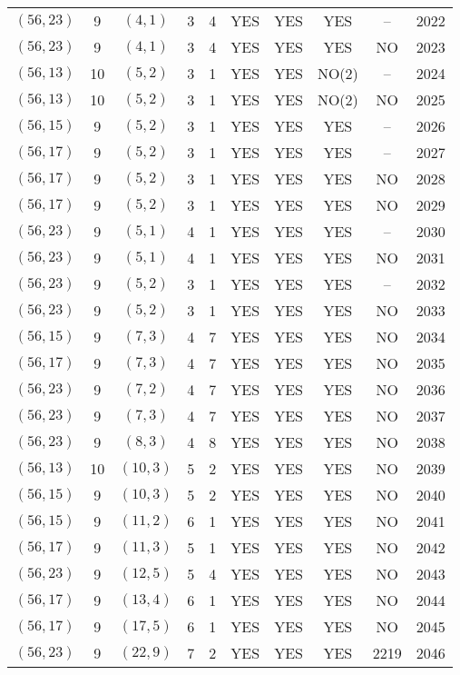 \begin{longtable}{|c|c|c|c|c|c|c|c|c|c|}
$(56, 23)$ & 9 & $(4, 1)$ & 3 & 4 & YES & YES & YES & -- & 2022\\
$(56, 23)$ & 9 & $(4, 1)$ & 3 & 4 & YES & YES & YES & NO & 2023\\
$(56, 13)$ & 10 & $(5, 2)$ & 3 & 1 & YES & YES & NO(2) & -- & 2024\\
$(56, 13)$ & 10 & $(5, 2)$ & 3 & 1 & YES & YES & NO(2) & NO & 2025\\
$(56, 15)$ & 9 & $(5, 2)$ & 3 & 1 & YES & YES & YES & -- & 2026\\
$(56, 17)$ & 9 & $(5, 2)$ & 3 & 1 & YES & YES & YES & -- & 2027\\
$(56, 17)$ & 9 & $(5, 2)$ & 3 & 1 & YES & YES & YES & NO & 2028\\
$(56, 17)$ & 9 & $(5, 2)$ & 3 & 1 & YES & YES & YES & NO & 2029\\
$(56, 23)$ & 9 & $(5, 1)$ & 4 & 1 & YES & YES & YES & -- & 2030\\
$(56, 23)$ & 9 & $(5, 1)$ & 4 & 1 & YES & YES & YES & NO & 2031\\
$(56, 23)$ & 9 & $(5, 2)$ & 3 & 1 & YES & YES & YES & -- & 2032\\
$(56, 23)$ & 9 & $(5, 2)$ & 3 & 1 & YES & YES & YES & NO & 2033\\
$(56, 15)$ & 9 & $(7, 3)$ & 4 & 7 & YES & YES & YES & NO & 2034\\
$(56, 17)$ & 9 & $(7, 3)$ & 4 & 7 & YES & YES & YES & NO & 2035\\
$(56, 23)$ & 9 & $(7, 2)$ & 4 & 7 & YES & YES & YES & NO & 2036\\
$(56, 23)$ & 9 & $(7, 3)$ & 4 & 7 & YES & YES & YES & NO & 2037\\
$(56, 23)$ & 9 & $(8, 3)$ & 4 & 8 & YES & YES & YES & NO & 2038\\
$(56, 13)$ & 10 & $(10, 3)$ & 5 & 2 & YES & YES & YES & NO & 2039\\
$(56, 15)$ & 9 & $(10, 3)$ & 5 & 2 & YES & YES & YES & NO & 2040\\
$(56, 15)$ & 9 & $(11, 2)$ & 6 & 1 & YES & YES & YES & NO & 2041\\
$(56, 17)$ & 9 & $(11, 3)$ & 5 & 1 & YES & YES & YES & NO & 2042\\
$(56, 23)$ & 9 & $(12, 5)$ & 5 & 4 & YES & YES & YES & NO & 2043\\
$(56, 17)$ & 9 & $(13, 4)$ & 6 & 1 & YES & YES & YES & NO & 2044\\
$(56, 17)$ & 9 & $(17, 5)$ & 6 & 1 & YES & YES & YES & NO & 2045\\
$(56, 23)$ & 9 & $(22, 9)$ & 7 & 2 & YES & YES & YES & 2219 & 2046\\

\end{longtable}
